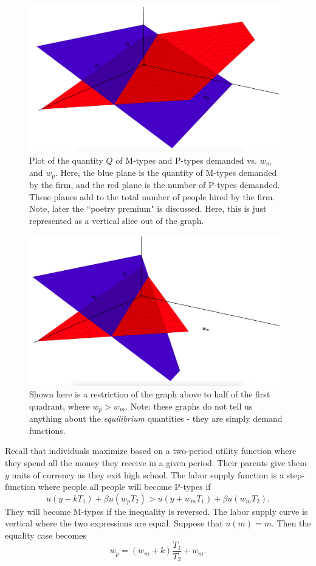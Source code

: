 \documentclass[12pt]{article}
\begin{document}
\begin{enumerate}
\begin{figure}
    \centering
    \includegraphics[scale=0.3]{qgraphfull.png}
    \caption{Plot of the quantity $Q$ of M-types and P-types demanded vs. $w_m$ and $w_p$. Here, the blue plane is the quantity of M-types demanded by the firm, and the red plane is the number of P-types demanded. These planes add to the total number of people hired by the firm. Note, later the ``poetry premium" is discussed. Here, this is just represented as a vertical slice out of the graph.}
\end{figure}

\begin{figure}
    \centering
    \includegraphics[scale=0.3]{qgraphhalf.png}
    \caption{Shown here is a restriction of the graph above to half of the first quadrant, where $w_p > w_m$.  Note: these graphs do not tell us anything about the \textit{equilibrium} quantities - they are simply demand functions.}
\end{figure}



Recall that individuals maximize based on a two-period utility function where they spend all the money they receive in a given period. Their parents give them $y$ units of currency as they exit high school. The labor supply function is a step-function where people all people will become P-types if
\[
    u(y - kT_1) + \beta{}u(w_pT_2) > u(y + w_mT_1) + \beta{}u(w_mT_2).
\]
They will become M-types if the inequality is reversed. The labor supply curve is vertical where the two expressions are equal. Suppose that $u(m) = m$. Then the equality case becomes
\[
    w_p = (w_m + k)\frac{T_1}{T_2} + w_m.
\]



\end{enumerate}
\end{document}
